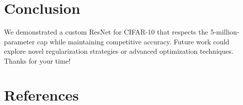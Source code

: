 \documentclass[letterpaper]{article}
\begin{document}
\section{Conclusion}
We demonstrated a custom ResNet for CIFAR-10 that respects the 5-million-parameter cap while maintaining competitive accuracy. Future work could explore novel regularization strategies or advanced optimization techniques. Thanks for your time!

\section{References}


\end{document}
